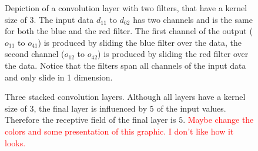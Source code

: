 \begin{figure}
\centering

\caption[Convolution multiple channels]{Depiction of a convolution layer with two filters, that have a kernel size of $3$. The input data $d_{11}$ to $d_{62}$ has two channels and is the same for both the blue and the red filter. The first channel of the output ($o_{11}$ to $o_{41}$) is produced by sliding the blue filter over the data, the second channel ($o_{12}$ to $o_{42}$) is produced by sliding the red filter over the data. Notice that the filters span all channels of the input data and only slide in 1 dimension.}\label{fig:convolution_channels}
\end{figure}
\begin{figure}
\centering

\caption[Receptive field]{Three stacked convolution layers. Although all layers have a kernel size of $3$, the final layer is influenced by $5$ of the input values. Therefore the receptive field of the final layer is $5$. \textcolor{red}{Maybe change the colors and some presentation of this graphic. I don't like how it looks.}}\label{fig:receptive_field}
\end{figure}

